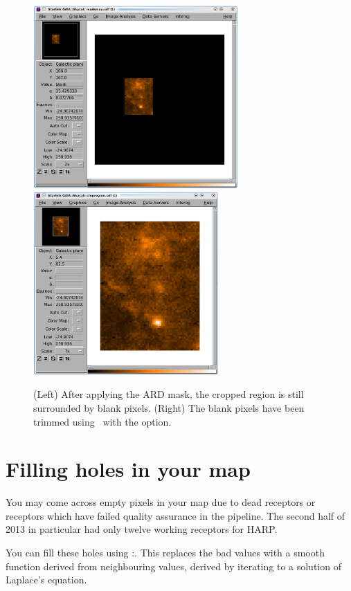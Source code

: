 \documentclass[11pt,oneside,chapters]{starlink}
\begin{document}
\begin{figure}[h!]
\begin{center}
\includegraphics[height=7cm]{sc20_ard5.eps}
\hspace{0.3cm}
\includegraphics[height=7cm]{sc20_ard6.eps}
\caption[Cropping a region of a 2D map.]{(Left) After applying the ARD
mask, the cropped region is still surrounded by blank pixels. (Right)
The blank pixels have been trimmed using \ndfcopy\ with the
 option.}
\label{fig:crop}
\end{center}
\end{figure}


\section{Filling holes in your map}
\label{sec:holes}

You may come across empty pixels in your map due to dead receptors or
receptors which have failed quality assurance in the pipeline. The
second half of 2013 in particular had only twelve working receptors for
HARP.

You can fill these holes using \Kappa:\fillbad. This replaces the bad
values with a smooth function derived from neighbouring values,
derived by iterating to a solution of Laplace's equation.
\end{document}
